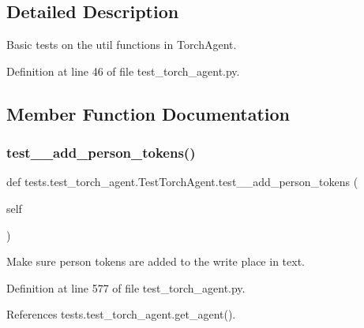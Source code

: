\subsection{Detailed Description}
\begin{DoxyVerb}Basic tests on the util functions in TorchAgent.\end{DoxyVerb}
 

Definition at line 46 of file test\+\_\+torch\+\_\+agent.\+py.



\subsection{Member Function Documentation}
\mbox{\label{classtests_1_1test__torch__agent_1_1TestTorchAgent_a81c474c311d1825377b107d40d567d8a}} 
\subsubsection{\texorpdfstring{test\+\_\+\+\_\+add\+\_\+person\+\_\+tokens()}{test\_\_add\_person\_tokens()}}
{\footnotesize\ttfamily def tests.\+test\+\_\+torch\+\_\+agent.\+Test\+Torch\+Agent.\+test\+\_\+\+\_\+add\+\_\+person\+\_\+tokens (\begin{DoxyParamCaption}\item[{}]{self }\end{DoxyParamCaption})}

\begin{DoxyVerb}Make sure person tokens are added to the write place in text.\end{DoxyVerb}
 

Definition at line 577 of file test\+\_\+torch\+\_\+agent.\+py.



References tests.\+test\+\_\+torch\+\_\+agent.\+get\+\_\+agent().

